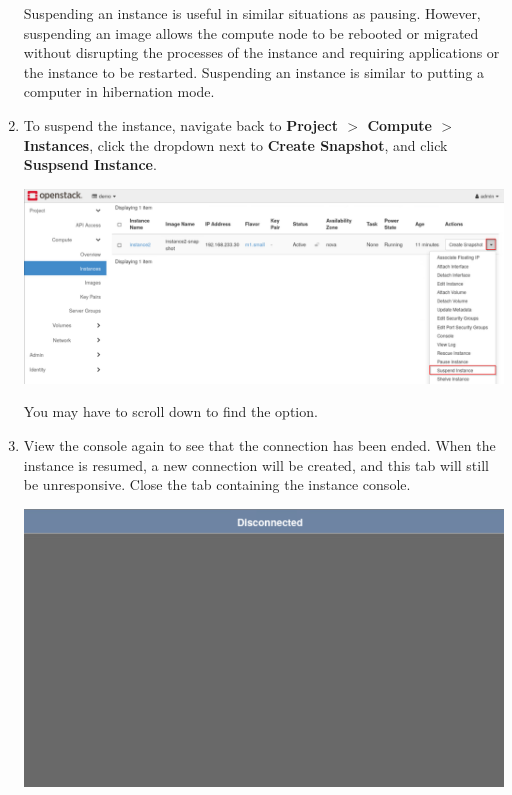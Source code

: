 \documentclass[letterpaper, 12pt]{article}
\begin{document}
\begin{enumerate}
    \begin{tipbox}
        Suspending an instance is useful in similar situations as pausing. However, suspending an image allows the
        compute node to be rebooted or migrated without disrupting the processes of the instance and requiring
        applications or the instance to be restarted. Suspending an instance is similar to putting a computer in
        hibernation mode.
    \end{tipbox}

    \item To suspend the instance, navigate back to \textbf{Project $>$ Compute $>$ Instances}, click the dropdown next
    to \textbf{Create Snapshot}, and click \textbf{Suspsend Instance}.

    \begin{center}
        \includegraphics[width=\linewidth]{images/part3/step8.png}
    \end{center}

    \begin{notebox}
        You may have to scroll down to find the option.
    \end{notebox}

    \item View the console again to see that the connection has been ended. When the instance is resumed, a new
    connection will be created, and this tab will still be unresponsive. Close the tab containing the instance console.

    \begin{center}
        \includegraphics[width=\linewidth]{images/part3/step9.png}
    \end{center}


\end{enumerate}
\end{document}
